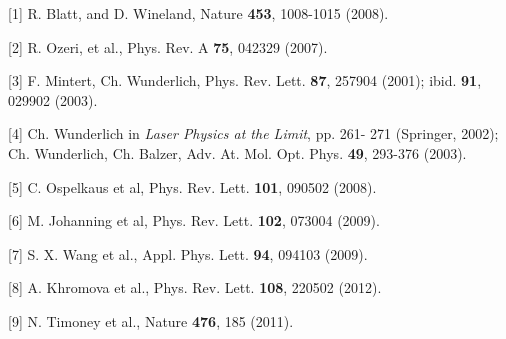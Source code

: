 {\normalsize
[1] R. Blatt, and D. Wineland, Nature {\bf 453}, 1008-1015 (2008).
\vsp

[2] R. Ozeri, et al., Phys. Rev. A {\bf 75}, 042329 (2007).
\vsp

[3] F. Mintert, Ch. Wunderlich, Phys. Rev. Lett. {\bf 87}, 257904 (2001); ibid. {\bf 91}, 029902 (2003).
\vsp

[4] Ch. Wunderlich in {\em Laser Physics at the Limit}, pp. 261- 271 (Springer, 2002);
Ch. Wunderlich,  Ch. Balzer, Adv. At. Mol. Opt. Phys. {\bf 49}, 293-376 (2003).
\vsp

[5] C. Ospelkaus et al, Phys. Rev. Lett. {\bf 101}, 090502 (2008).
\vsp

[6] M. Johanning et al, Phys. Rev. Lett. {\bf 102}, 073004 (2009).
\vsp

[7] S. X. Wang et al., Appl. Phys. Lett. {\bf 94}, 094103 (2009).
\vsp

[8]  A. Khromova et al., Phys. Rev. Lett. {\bf 108}, 220502 (2012).
\vsp

[9] N. Timoney et al., Nature {\bf 476}, 185 (2011).
}

\vspace{\baselineskip} 